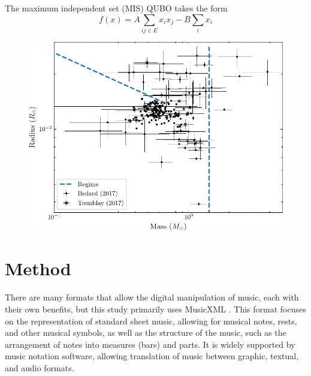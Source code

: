 \documentclass[aps,pra,10pt,twocolumn]{revtex4-2}
\begin{document}
The maximum independent set (MIS) QUBO takes the form
\begin{equation}
    f(x)=A\sum_{ij\in E}x_ix_j-B\sum_i x_i
    \label{eq:MIS}
\end{equation}





\begin{figure}[h]
    \centering
    \includegraphics[width=\linewidth]{images/regime-model.pdf}
    \caption{}
    \label{fig:regime}
\end{figure}


\section{Method}

There are many formats that allow the digital manipulation of music, each with their own benefits, but this study primarily uses MusicXML \cite{musicxml}. This format focuses on the representation of standard sheet music, allowing for musical notes, rests, and other musical symbols, as well as the structure of the music, such as the arrangement of notes into measures (bars) and parts. It is widely supported by music notation software, allowing translation of music between graphic, textual, and audio formats.
\end{document}
